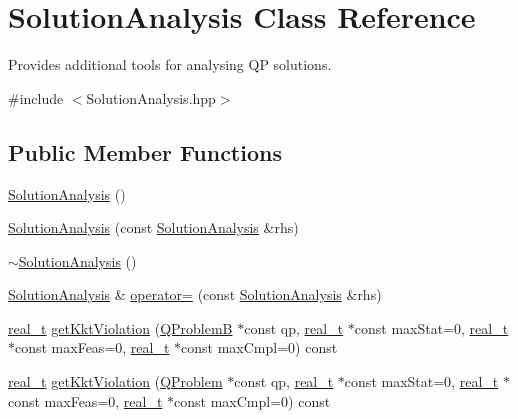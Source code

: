 \hypertarget{class_solution_analysis}{}\section{Solution\+Analysis Class Reference}
\label{class_solution_analysis}


Provides additional tools for analysing QP solutions.  




{\ttfamily \#include $<$Solution\+Analysis.\+hpp$>$}

\subsection*{Public Member Functions}
\begin{DoxyCompactItemize}
\item 
\hyperlink{class_solution_analysis_a8c1dcc27cb1adc87c518984350d9d97b}{Solution\+Analysis} ()
\item 
\hyperlink{class_solution_analysis_aade7aa6f4702f7417c0c2c4d836b52e1}{Solution\+Analysis} (const \hyperlink{class_solution_analysis}{Solution\+Analysis} \&rhs)
\item 
\hyperlink{class_solution_analysis_a742aea657f600946f614d7531ea19846}{$\sim$\+Solution\+Analysis} ()
\item 
\hyperlink{class_solution_analysis}{Solution\+Analysis} \& \hyperlink{class_solution_analysis_ad4194a997bcae34263cec94f161b3409}{operator=} (const \hyperlink{class_solution_analysis}{Solution\+Analysis} \&rhs)
\item 
\hyperlink{qp_o_a_s_e_s__wrapper_8h_a0d00e2b3dfadee81331bbb39068570c4}{real\+\_\+t} \hyperlink{class_solution_analysis_a7243601d878657bedd5c8e38d8b6b566}{get\+Kkt\+Violation} (\hyperlink{class_q_problem_b}{Q\+ProblemB} $\ast$const qp, \hyperlink{qp_o_a_s_e_s__wrapper_8h_a0d00e2b3dfadee81331bbb39068570c4}{real\+\_\+t} $\ast$const max\+Stat=0, \hyperlink{qp_o_a_s_e_s__wrapper_8h_a0d00e2b3dfadee81331bbb39068570c4}{real\+\_\+t} $\ast$const max\+Feas=0, \hyperlink{qp_o_a_s_e_s__wrapper_8h_a0d00e2b3dfadee81331bbb39068570c4}{real\+\_\+t} $\ast$const max\+Cmpl=0) const
\item 
\hyperlink{qp_o_a_s_e_s__wrapper_8h_a0d00e2b3dfadee81331bbb39068570c4}{real\+\_\+t} \hyperlink{class_solution_analysis_a7c333d391c2f983163fe194b329f96aa}{get\+Kkt\+Violation} (\hyperlink{class_q_problem}{Q\+Problem} $\ast$const qp, \hyperlink{qp_o_a_s_e_s__wrapper_8h_a0d00e2b3dfadee81331bbb39068570c4}{real\+\_\+t} $\ast$const max\+Stat=0, \hyperlink{qp_o_a_s_e_s__wrapper_8h_a0d00e2b3dfadee81331bbb39068570c4}{real\+\_\+t} $\ast$const max\+Feas=0, \hyperlink{qp_o_a_s_e_s__wrapper_8h_a0d00e2b3dfadee81331bbb39068570c4}{real\+\_\+t} $\ast$const max\+Cmpl=0) const

\end{DoxyCompactItemize}
